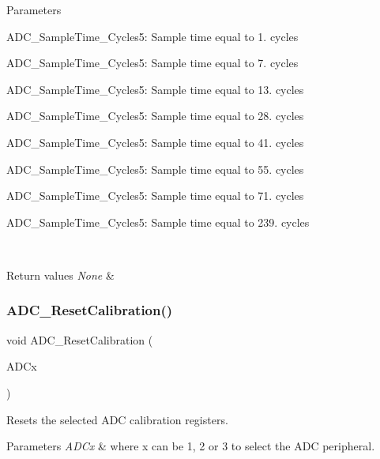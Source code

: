 \begin{DoxyParams}{Parameters}
\begin{DoxyItemize}
\item A\+D\+C\+\_\+\+Sample\+Time\+\_\+Cycles5\+: Sample time equal to 1. cycles \item A\+D\+C\+\_\+\+Sample\+Time\+\_\+Cycles5\+: Sample time equal to 7. cycles \item A\+D\+C\+\_\+\+Sample\+Time\+\_\+Cycles5\+: Sample time equal to 13. cycles \item A\+D\+C\+\_\+\+Sample\+Time\+\_\+Cycles5\+: Sample time equal to 28. cycles \item A\+D\+C\+\_\+\+Sample\+Time\+\_\+Cycles5\+: Sample time equal to 41. cycles \item A\+D\+C\+\_\+\+Sample\+Time\+\_\+Cycles5\+: Sample time equal to 55. cycles \item A\+D\+C\+\_\+\+Sample\+Time\+\_\+Cycles5\+: Sample time equal to 71. cycles \item A\+D\+C\+\_\+\+Sample\+Time\+\_\+Cycles5\+: Sample time equal to 239. cycles\end{DoxyItemize}
\\
\hline
\end{DoxyParams}

\begin{DoxyRetVals}{Return values}
{\em None} & \\
\hline
\end{DoxyRetVals}
\mbox{\label{group___a_d_c___private___functions_ga3d542020ba28c1d16238a0defbee6d8f}} 
\subsubsection{\texorpdfstring{ADC\_ResetCalibration()}{ADC\_ResetCalibration()}}
{\footnotesize\ttfamily void A\+D\+C\+\_\+\+Reset\+Calibration (\begin{DoxyParamCaption}\item[{\mbox{\hyperlink{struct_a_d_c___type_def}{A\+D\+C\+\_\+\+Type\+Def}} $\ast$}]{A\+D\+Cx }\end{DoxyParamCaption})}



Resets the selected A\+DC calibration registers. 


\begin{DoxyParams}{Parameters}
{\em A\+D\+Cx} & where x can be 1, 2 or 3 to select the A\+DC peripheral. \\
\hline
\end{DoxyParams}

